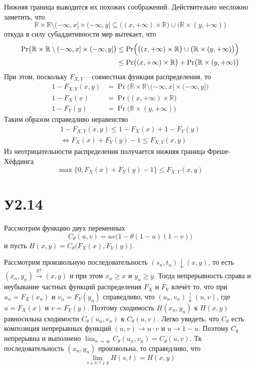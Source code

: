 \documentclass[a4paper]{article}
\newcommand{\Real}{\mathbb{R}}
\begin{document}
Нижняя граница выводится их похожих соображений. Действительно несложно заметить,
что
\[
\Real\times \Real \setminus (-\infty,x]\times (-\infty,y]
\subseteq \bigl((x,+\infty)\times\Real\bigr) \cup \bigl(\Real\times(y,+\infty)\bigr)
\]
откуда в силу субаддитивности мер вытекает, что
\begin{align*}
	\Pr\bigl( \Real\times \Real \setminus (-\infty,x]\times (-\infty,y] \bigr)
	&\leq \Pr\Bigl( \bigl((x,+\infty)\times\Real\bigr) \cup \bigl(\Real\times(y,+\infty)\bigr) \Bigr)\\
	&\leq \Pr\bigl( (x,+\infty)\times \Real \bigr) + \Pr\bigl( \Real\times (y,+\infty) \bigr)
\end{align*}
При этом, поскольку $F_{X,Y}$ -- совместная функция распределения, то
\begin{align*}
	1-F_{X,Y}(x,y) &= \Pr\bigl( \Real\times \Real \setminus (-\infty,x]\times (-\infty,y] \bigr)\\
	1-F_X(x) &= \Pr\bigl( (x,+\infty)\times \Real \bigr)\\
	1-F_Y(y) &= \Pr\bigl( \Real\times (y,+\infty) \bigr)
\end{align*}
Таким образом справедливо неравенство
\begin{multline*}
	1-F_{X,Y}(x,y) \leq 1-F_X(x) + 1-F_Y(y) \\ \Leftrightarrow F_X(x) + F_Y(y) - 1 \leq F_{X,Y}(x,y)
\end{multline*}
Из неотрицательности распределения получается нижняя граница Фреше-Хёфдинга
\[ \max\bigl\{0,F_X(x) + F_Y(y) - 1\bigr\} \leq F_{X,Y}(x,y) \]


\section{У2.14} %
\label{sec:problem_2_14}

Рассмотрим функцию двух переменных
\[C_\theta(u,v) = uv \bigl(1-\theta(1-u)(1-v)\bigr)\]
и пусть $H(x,y) = C_\theta\bigl(F_X(x), F_Y(y)\bigr)$.

Рассмотрим произвольную последовательность $(s_n,t_n) \downarrow (x,y)$, то есть
$(x_n,y_n) \overset{\Real^2}{\to}(x,y)$ и при этом $x_n\geq x$ и $y_n\geq y$. Тогда
непрерывность справа и неубывание частных функций распределения $F_X$ и $F_Y$ влечёт
то, что при $u_n=F_X(x_n)$ и $v_n=F_Y(y_n)$ справедливо, что $(u_n,v_n)\downarrow (u,v)$,
где $u=F_X(x)$ и $v=F_Y(y)$. Поэтому сходимость $H(x_n,y_n)$ к $H(x,y)$ равносильна
сходимости $C_\theta(u_n,v_n)$ к $C_\theta(u,v)$. Легко увидеть, что $C_\theta$ есть
композиция непрерывных функций $(u,v)\to u\cdot v$ и $u\to 1-u$. Поэтому $C_\theta$
непрерывна и выполнено $\lim_{n\to \infty} C_\theta(u_n,v_n) = C_\theta(u,v)$.
Тк последовательность $(x_n,y_n)$ произвольна, то справедливо, что
\[\lim_{s\downarrow x,t\downarrow y} H(s,t) = H(x,y)\]
\end{document}
